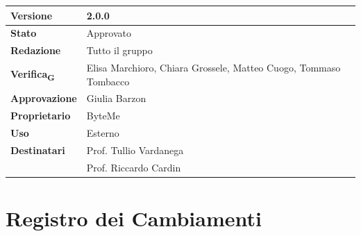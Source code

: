 \documentclass[11pt,a4paper]{article}
\newcommand{\gls}[1]{#1\textsubscript{G}}
\begin{document}
\begin{titlepage}
    \begin{table}[H]
        \centering
        \begin{tabular}{|l|p{5cm}|}
            \hline
            \textbf{Versione} & 2.0.0\\
            \hline
            \textbf{Stato} & Approvato\\
            \hline
            \textbf{Redazione} & Tutto il gruppo \\
            \hline
            \textbf{\gls{Verifica}} & Elisa Marchioro, Chiara Grossele, Matteo Cuogo, Tommaso Tombacco \\
            \hline
            \textbf{Approvazione} & Giulia Barzon\\
            \hline
            \textbf{Proprietario} & ByteMe \\
            \hline
            \textbf{Uso} & Esterno \\
            \hline
            \textbf{Destinatari} & Prof. Tullio Vardanega \\ & Prof. Riccardo Cardin \\
            \hline
        \end{tabular}
    \end{table}
    
    \vfill
\end{titlepage}

\thispagestyle{empty}
\section*{Registro dei Cambiamenti}
\end{document}
